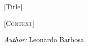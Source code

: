 

\begin{titlepage}
	\thispagestyle{styletitlepage}
	\begin{addmargin}[4cm]{0cm}
		\vspace*{9em}
		\begin{flushright}
		{\Huge
			[Title]\par
			[Subtitle]\par}
		\vspace{6\baselineskip}
		{\Large\textsc{[Context]}\par}
		\vfill
		{\large\emph{Author:} Leonardo Barbosa}
		\end{flushright}
	\end{addmargin}
	\fancyfoot[LE,RO]{\thepage}
\end{titlepage}
